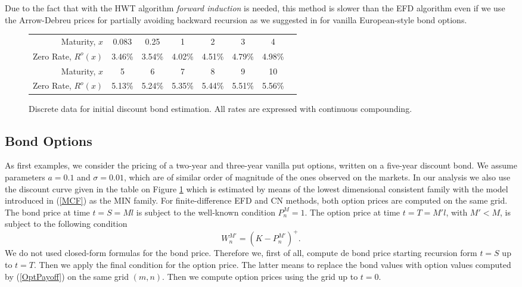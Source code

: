 Due to the fact that with the HWT algorithm {\sl forward induction} is
needed, this method is slower than the EFD algorithm even if we use
the Arrow-Debreu prices for partially avoiding backward recursion as
we suggested in \cite[Chap. 2, pp. 23]{N:2003} for vanilla
European-style bond options.  
\begin{figure}[h!]
\caption{Discrete data for initial discount bond estimation. All rates
  are expressed with continuous compounding. \label{zeroes}}
\begin{center}
\begin{tabular}{r|ccccccc}
\hline\hline
{\sc Maturity, $x$} & 0.083 & 0.25 & 1 & 2 & 3 & 4\\
{\sc Zero Rate, $R^o(x)$} & 3.46\% & 3.54\% & 4.02\% & 4.51\%
& 4.79\% & 4.98\% \\ 
\hline
{\sc Maturity, $x$}& 5& 6& 7& 8& 9 & 10\\
{\sc Zero Rate, $R^o(x)$}  &  5.13\% & 5.24\% & 5.35\% & 5.44\%
& 5.51\% & 5.56\%\\ 
\hline
\end{tabular}
\end{center}
\end{figure}
\subsection*{Bond Options}
As first examples, we consider the pricing of a two-year and
three-year vanilla put options, written on a five-year discount
bond. We assume parameters $a = 0.1$ and $\sigma = 0.01$, which are of
similar order of magnitude of the ones observed on the markets. In our
analysis we also use the discount curve given in the table on Figure
\ref{zeroes} which is estimated by means of the lowest dimensional
consistent family with the model introduced in (\ref{MCF}) as the MIN
family. For finite-difference EFD and CN methods, both option
prices are computed on the same grid. The bond price at time $t = S
=Ml$ is subject to the well-known condition $P^M_n = 1$. The option
price at time $ t = T = M'l$, with $M' < M$,  is subject to the
following condition  
\begin{equation}
\label{OptPayoff}
W^{M'}_n = (K - P^{M'}_n)^+.
\end{equation}
We do not used closed-form formulas for the bond price. Therefore we,
first of all, compute de bond price starting recursion form $t = S$ up
to $ t =T $. Then we apply the final condition for the option
price. The latter means to replace the bond values with option values
computed by (\ref{OptPayoff}) on the same grid $(m,n)$. Then we
compute option prices using the grid up to $t = 0$.

